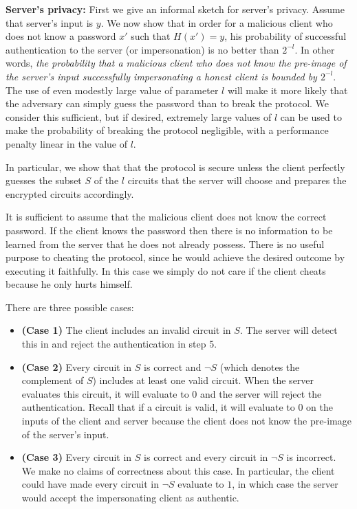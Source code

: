 \noindent
{\bf Server's privacy:} First we give an informal sketch for server's
privacy. Assume that server's input is $y$.  We now show that in order
for a malicious client who does not know a password $x'$ such that
$H(x') = y$, his probability of successful authentication to the
server (or impersonation) is no better than $2^{-l}$. In other words,
{\it the probability that a malicious client who does not know the
pre-image of the server's input successfully impersonating a honest client is bounded
by $2^{-l}$}. The use of even modestly large value of 
parameter $l$ will make it more likely that the adversary can simply
guess the password than to break the protocol. We consider this
sufficient, but if desired, extremely large values of $l$ can be used
to make the probability of breaking the protocol negligible, with a
performance penalty linear in the value of $l$. 

In particular, we show that that the protocol is secure unless the
client perfectly guesses the subset $S$ of the $l$ circuits that
the server will choose and prepares the encrypted circuits accordingly.

It is sufficient to assume that the malicious client does not know
the correct password. If the client knows the password then there
is no information to be learned from the server that he does not already
possess. There is no useful purpose to cheating the protocol, since
he would achieve the desired outcome by executing it faithfully. In
this case we simply do not care if the client cheats because he only
hurts himself.

There are three possible cases:
\begin{itemize}
\item {\bf (Case 1)} The client includes an invalid circuit in $S$. The server
will detect this in and reject the authentication
in step 5.

\item {\bf (Case 2)} Every circuit in $S$ is correct and $\neg S$ (which
denotes the complement of $S$) includes at least
one valid circuit. When the server evaluates this circuit, it will
evaluate to $0$ and the server will reject
the authentication. Recall that if a circuit is valid, it will evaluate
to $0$ on the inputs of the client and server because the client does not
know the pre-image of the server's input.

\item {\bf (Case 3)} Every circuit in $S$ is correct and every circuit
in $\neg S$ is incorrect. We make no claims of correctness about this
case. In particular, the client could have made every circuit in $\neg S$
evaluate to $1$, in which case the server would accept the impersonating
client as authentic.  

\end{itemize}

